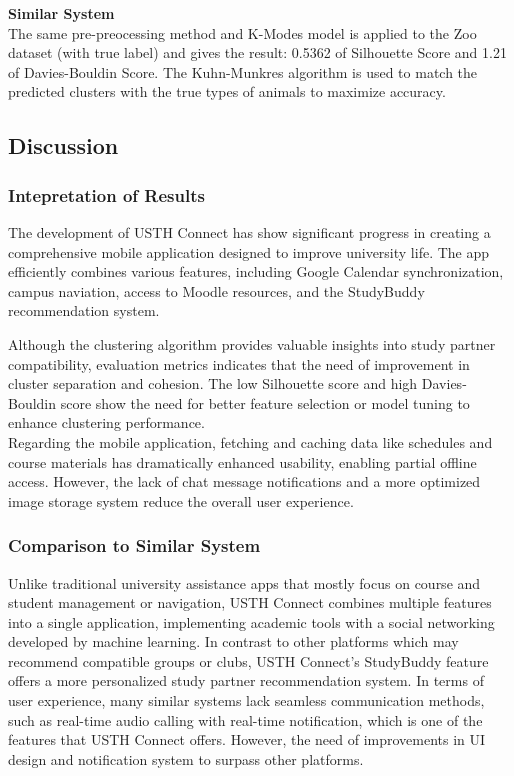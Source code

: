 \documentclass[12pt]{article}
\begin{document}
\textbf{Similar System} \\

The same pre-preocessing method and K-Modes model is applied to the Zoo dataset (with true label) and gives the result: 0.5362 of Silhouette Score and 1.21 of Davies-Bouldin Score. The Kuhn-Munkres\citep{zhu2011efficient} algorithm is used to match the predicted clusters with the true types of animals to maximize accuracy.

\subsection{Discussion}
\subsubsection{Intepretation of Results}
The development of USTH Connect has show significant progress in creating a comprehensive mobile application designed to improve university life.
The app efficiently combines various features, including Google Calendar synchronization, campus naviation, access to Moodle resources, and the StudyBuddy recommendation system.

Although the clustering algorithm provides valuable insights into study partner compatibility, evaluation metrics indicates that the need of improvement in cluster separation and cohesion.
The low Silhouette score and high Davies-Bouldin score show the need for better feature selection or model tuning to enhance clustering performance. \\

Regarding the mobile application, fetching and caching data like schedules and course materials has dramatically enhanced usability, enabling partial offline access.
However, the lack of chat message notifications and a more optimized image storage system reduce the overall user experience.

\pagebreak

\subsubsection{Comparison to Similar System}
Unlike traditional university assistance apps that mostly focus on course and student management or navigation, USTH Connect combines multiple features into a single application, implementing academic tools with a social networking developed by machine learning.
In contrast to other platforms which may recommend compatible groups or clubs, USTH Connect's StudyBuddy feature offers a more personalized study partner recommendation system.
In terms of user experience, many similar systems lack seamless communication methods, such as real-time audio calling with real-time notification, which is one of the features that USTH Connect offers.
However, the need of improvements in UI design and notification system to surpass other platforms.
\end{document}
